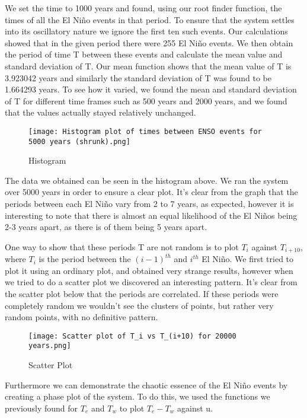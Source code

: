 \documentclass{article}
\begin{document}
We set the time to 1000 years and found, using our root finder function, the times of all the El Niño events in that period. To ensure that the system settles into its oscillatory nature we ignore the first ten such events. Our calculations showed that in the given period there were 255 El Niño events. We then obtain the period of time T between these events and calculate the mean value and standard deviation of T. Our mean function shows that the mean value of T is 3.923042 years and similarly the standard deviation of T was found to be 1.664293 years. To see how it varied, we found the mean and standard deviation of T for different time frames such as 500 years and 2000 years, and we found that the values actually stayed relatively unchanged.

\newpage

\begin{figure}[h]
\centering
\texttt{[image: Histogram plot of times between ENSO events for 5000 years (shrunk).png]}
\caption{\label{fig:Diagram}Histogram}
\end{figure}

The data we obtained can be seen in the histogram above. We ran the system over 5000 years in order to ensure a clear plot. It’s clear from the graph that the periods between each El Niño vary from 2 to 7 years, as expected, however it is interesting to note that there is almost an equal likelihood of the El Niños being 2-3 years apart, as there is of them being 5 years apart. 

One way to show that these periods T are not random is to plot $T_i$ against $T_{i+10}$, where $T_i$ is the period between the $(i - 1)^{th}$ and $i^{th}$ El Niño. We first tried to plot it using an ordinary plot, and obtained very strange results, however when we tried to do a scatter plot we discovered an interesting pattern. It’s clear from the scatter plot below that the periods are correlated. If these periods were completely random we wouldn’t see the clusters of points, but rather very random points, with no definitive pattern. 

\begin{figure}[h]
\centering
\texttt{[image: Scatter plot of T\_i vs T\_(i+10) for 20000 years.png]}
\caption{\label{fig:Diagram}Scatter Plot}
\end{figure}

\newpage

Furthermore we can demonstrate the chaotic essence of the El Niño events by creating a phase plot of the system. To do this, we used the functions we previously found for $T_e$ and $T_w$ to plot $T_e - T_w$ against u. 
\end{document}
